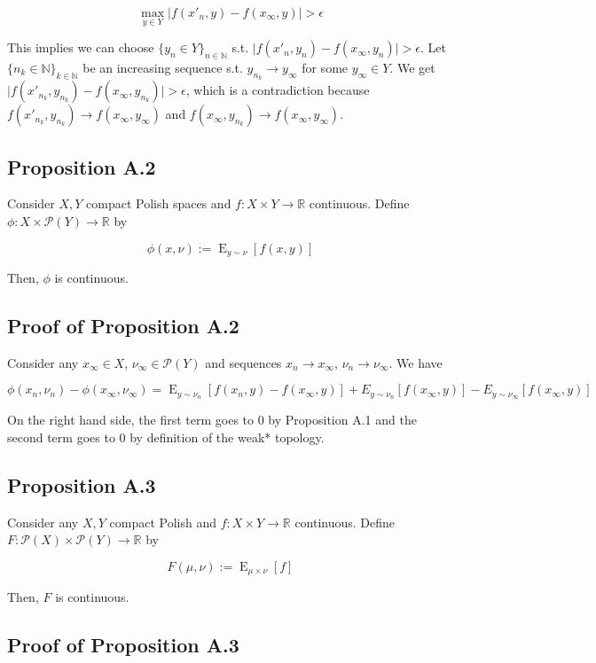 \documentclass[a4paper]{article}
\DeclareMathOperator{\E}{E}
\newcommand{\Nats}{\mathbb{N}}
\newcommand{\Reals}{\mathbb{R}}
\newcommand{\Abs}[1]{\lvert #1 \rvert}
\newcommand{\Prob}{\mathcal{P}}
\begin{document}
$${\max_{y \in Y} \Abs{f(x'_n,y)-f(x_\infty,y)} > \epsilon}$$

This implies we can choose ${\{y_n \in Y\}_{n \in \Nats}}$ s.t. ${\Abs{f(x'_n,y_n)-f(x_\infty,y_n)} > \epsilon}$. Let ${\{n_k \in \Nats\}_{k \in \Nats}}$ be an increasing sequence s.t. ${y_{n_k} \rightarrow y_\infty}$ for some ${y_\infty \in Y}$. We get ${\Abs{f(x'_{n_k},y_{n_k})-f(x_\infty,y_{n_k})} > \epsilon}$, which is a contradiction because ${f(x'_{n_k},y_{n_k}) \rightarrow f(x_\infty,y_\infty)}$ and ${f(x_\infty,y_{n_k}) \rightarrow f(x_\infty,y_\infty)}$.

\subsection{Proposition A.2}

Consider ${X,Y}$ compact Polish spaces and ${f: X \times Y \rightarrow \Reals}$ continuous. Define ${\phi: X \times \Prob(Y) \rightarrow \Reals}$ by 

$${\phi(x,\nu):=\E_{y \sim \nu}[f(x,y)]}$$ 

Then, ${\phi}$ is continuous.

\subsection{Proof of Proposition A.2}

Consider any ${x_\infty \in X}$, ${\nu_\infty \in \Prob(Y)}$ and sequences ${x_n \rightarrow x_\infty}$, ${\nu_n \rightarrow \nu_\infty}$. We have

$$\phi(x_n,\nu_n)- \phi(x_\infty,\nu_\infty)=\E_{y \sim \nu_n}[f(x_n,y)-f(x_\infty,y)]+E_{y \sim \nu_n}[f(x_\infty,y)]-E_{y \sim \nu_\infty}[f(x_\infty,y)]$$

On the right hand side, the first term goes to 0 by Proposition A.1 and the second term goes to 0 by definition of the weak* topology.

\subsection{Proposition A.3}

Consider any ${X,Y}$ compact Polish and ${f: X \times Y \rightarrow \Reals}$ continuous. Define ${F: \Prob(X) \times \Prob(Y) \rightarrow \Reals}$ by 

$${F(\mu,\nu):=\E_{\mu \times \nu}[f]}$$ 

Then, ${F}$ is continuous.

\subsection{Proof of Proposition A.3}
\end{document}

